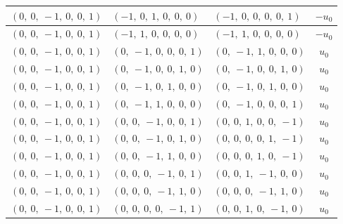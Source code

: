 \documentclass[11pt]{article}
\theoremstyle{definition}
\begin{document}
\begin{longtable}{|l|l|l|c|}
    \hline
    $\left( 0, \  0, \  -1, \  0, \  0, \  1\right)$ & $\left( -1, \  0, \  1, \  0, \  0, \  0\right)$ & $\left( -1, \  0, \  0, \  0, \  0, \  1\right)$ & $- u_{0}$ \\
    \hline
    $\left( 0, \  0, \  -1, \  0, \  0, \  1\right)$ & $\left( -1, \  1, \  0, \  0, \  0, \  0\right)$ & $\left( -1, \  1, \  0, \  0, \  0, \  0\right)$ & $- u_{0}$ \\
    \hline
    $\left( 0, \  0, \  -1, \  0, \  0, \  1\right)$ & $\left( 0, \  -1, \  0, \  0, \  0, \  1\right)$ & $\left( 0, \  -1, \  1, \  0, \  0, \  0\right)$ & $u_{0}$ \\
    \hline
    $\left( 0, \  0, \  -1, \  0, \  0, \  1\right)$ & $\left( 0, \  -1, \  0, \  0, \  1, \  0\right)$ & $\left( 0, \  -1, \  0, \  0, \  1, \  0\right)$ & $u_{0}$ \\
    \hline
    $\left( 0, \  0, \  -1, \  0, \  0, \  1\right)$ & $\left( 0, \  -1, \  0, \  1, \  0, \  0\right)$ & $\left( 0, \  -1, \  0, \  1, \  0, \  0\right)$ & $u_{0}$ \\
    \hline
    $\left( 0, \  0, \  -1, \  0, \  0, \  1\right)$ & $\left( 0, \  -1, \  1, \  0, \  0, \  0\right)$ & $\left( 0, \  -1, \  0, \  0, \  0, \  1\right)$ & $u_{0}$ \\
    \hline
    $\left( 0, \  0, \  -1, \  0, \  0, \  1\right)$ & $\left( 0, \  0, \  -1, \  0, \  0, \  1\right)$ & $\left( 0, \  0, \  1, \  0, \  0, \  -1\right)$ & $u_{0}$ \\
    \hline
    $\left( 0, \  0, \  -1, \  0, \  0, \  1\right)$ & $\left( 0, \  0, \  -1, \  0, \  1, \  0\right)$ & $\left( 0, \  0, \  0, \  0, \  1, \  -1\right)$ & $u_{0}$ \\
    \hline
    $\left( 0, \  0, \  -1, \  0, \  0, \  1\right)$ & $\left( 0, \  0, \  -1, \  1, \  0, \  0\right)$ & $\left( 0, \  0, \  0, \  1, \  0, \  -1\right)$ & $u_{0}$ \\
    \hline
    $\left( 0, \  0, \  -1, \  0, \  0, \  1\right)$ & $\left( 0, \  0, \  0, \  -1, \  0, \  1\right)$ & $\left( 0, \  0, \  1, \  -1, \  0, \  0\right)$ & $u_{0}$ \\
    \hline
    $\left( 0, \  0, \  -1, \  0, \  0, \  1\right)$ & $\left( 0, \  0, \  0, \  -1, \  1, \  0\right)$ & $\left( 0, \  0, \  0, \  -1, \  1, \  0\right)$ & $u_{0}$ \\
    \hline
    $\left( 0, \  0, \  -1, \  0, \  0, \  1\right)$ & $\left( 0, \  0, \  0, \  0, \  -1, \  1\right)$ & $\left( 0, \  0, \  1, \  0, \  -1, \  0\right)$ & $u_{0}$ \\

\end{longtable}
\end{document}
